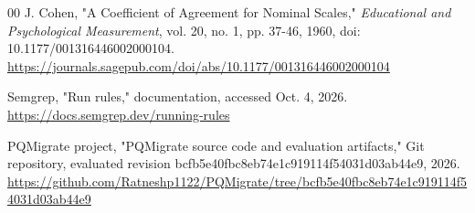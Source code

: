 \documentclass[conference,a4paper]{IEEEtran}
\begin{document}
\begin{thebibliography}{00}
J. Cohen, "A Coefficient of Agreement for Nominal Scales," \emph{Educational and Psychological Measurement}, vol. 20, no. 1, pp. 37-46, 1960, doi: 10.1177/001316446002000104. \url{https://journals.sagepub.com/doi/abs/10.1177/001316446002000104}

Semgrep, "Run rules," documentation, accessed Oct. 4, 2026. \url{https://docs.semgrep.dev/running-rules}

PQMigrate project, "PQMigrate source code and evaluation artifacts," Git repository, evaluated revision bcfb5e40fbc8eb74e1c919114f54031d03ab44e9, 2026. \url{https://github.com/Ratneshp1122/PQMigrate/tree/bcfb5e40fbc8eb74e1c919114f54031d03ab44e9}
\end{thebibliography}
\end{document}
